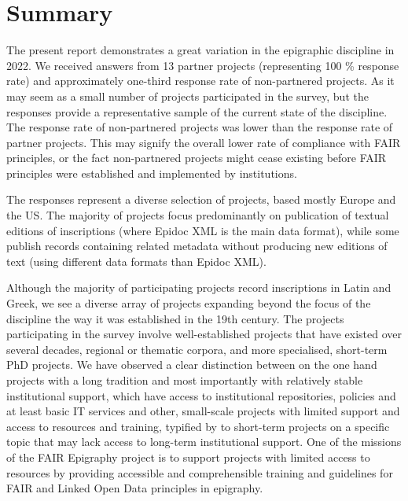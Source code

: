 \documentclass[
  12pt,
]{scrreprt}
\begin{document}
\hypertarget{summary}{%
\chapter{Summary}\label{summary}}

The present report demonstrates a great variation in the epigraphic
discipline in 2022. We received answers from 13 partner projects
(representing 100 \% response rate) and approximately one-third response
rate of non-partnered projects. As it may seem as a small number of
projects participated in the survey, but the responses provide a
representative sample of the current state of the discipline. The
response rate of non-partnered projects was lower than the response rate
of partner projects. This may signify the overall lower rate of
compliance with FAIR principles, or the fact non-partnered projects
might cease existing before FAIR principles were established and
implemented by institutions.

The responses represent a diverse selection of projects, based mostly
Europe and the US. The majority of projects focus predominantly on
publication of textual editions of inscriptions (where Epidoc XML is the
main data format), while some publish records containing related
metadata without producing new editions of text (using different data
formats than Epidoc XML).

Although the majority of participating projects record inscriptions in
Latin and Greek, we see a diverse array of projects expanding beyond the
focus of the discipline the way it was established in the 19th century.
The projects participating in the survey involve well-established
projects that have existed over several decades, regional or thematic
corpora, and more specialised, short-term PhD projects. We have observed
a clear distinction between on the one hand projects with a long
tradition and most importantly with relatively stable institutional
support, which have access to institutional repositories, policies and
at least basic IT services and other, small-scale projects with limited
support and access to resources and training, typified by to short-term
projects on a specific topic that may lack access to long-term
institutional support. One of the missions of the FAIR Epigraphy project
is to support projects with limited access to resources by providing
accessible and comprehensible training and guidelines for FAIR and
Linked Open Data principles in epigraphy.
\end{document}
